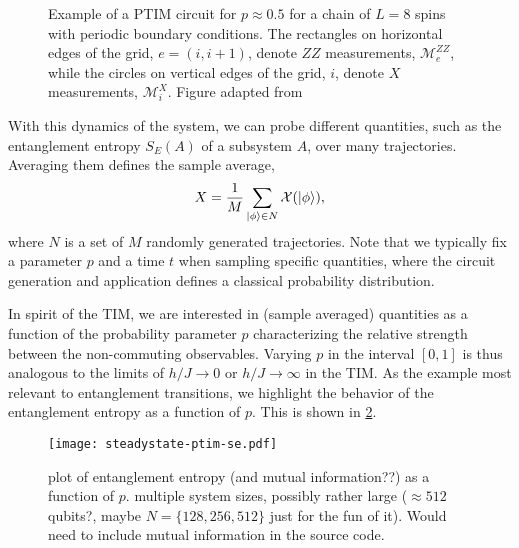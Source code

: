 \begin{figure}[t]
  \centering
  
  \caption{Example of a PTIM circuit for $p\approx 0.5$ for a chain of $L=8$
  spins with periodic boundary conditions. The rectangles on horizontal edges
  of the grid, $e=(i,i+1)$, denote $ZZ$ measurements, $\mathcal{M}^{ZZ}_e$, while the circles
  on vertical edges of the grid, $i$, denote $X$ measurements, $\mathcal{M}^X_i$.
Figure adapted from \cite{langEntanglementTransitionProjective2020}}
  \label{fig:ptim-circuit}
\end{figure}

With this dynamics of the system, we can probe different quantities, such as
the entanglement entropy $S_E(A)$ of a subsystem $A$, over many trajectories.
Averaging them defines the sample average,
\begin{align}
  X = \frac{1}{M} \sum_{\ket{\phi} \in N} \mathcal{X}(\ket{\phi})
,\end{align}
where $N$ is a set of $M$ randomly generated trajectories. Note that we
typically fix a parameter $p$ and a time $t$ when sampling specific quantities,
where the circuit generation and application defines a classical probability
distribution. 

In spirit of the TIM, we are interested in (sample averaged) quantities as a
function of the probability parameter $p$ characterizing the relative strength
between the non-commuting observables. Varying $p$ in the interval $[0,1]$ is
thus analogous to the limits of $h /J \to 0$ or  $h /J \to \infty$ in the TIM.
As the example most relevant to entanglement transitions, we highlight the
behavior of the entanglement entropy as a function of $p$. This is shown in
\cref{fig:phase-transition}.

\begin{figure}[t]
  \centering
  \texttt{[image: steadystate-ptim-se.pdf]}
  \caption{plot of entanglement entropy (and mutual information??) as a
  function of $p$. multiple system sizes, possibly rather large ($\approx 512$
qubits?, maybe $N=\{128,256,512\}$ just for the fun of it). Would need to
include mutual information in the source code.}
  \label{fig:phase-transition}
\end{figure}

